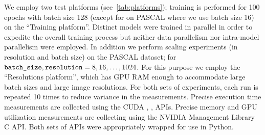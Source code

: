 

We employ two test platforms (see~\cref{tab:platforms});
training is performed for 100 epochs with batch size 128 (except for on PASCAL where we use batch size 16) on the ``Training platform''.
Distinct models were trained in parallel in order to expedite the overall training process but neither data parallelism nor intra-model parallelism were employed.
In addition we perform scaling experiments (in resolution and batch size) on the PASCAL dataset;
for $\texttt{batch\_size}, \texttt{resolution} = 8, 16, \dots, 1024$.
For this purpose we employ the ``Resolutions platform'', which has GPU RAM enough to accommodate large batch sizes and large image resolutions.
For both sets of experiments, each run is repeated 10 times to reduce variance in the measurements.
Precise execution time measurements are collected using the CUDA , ,  APIs.
Precise memory and GPU utilization measurements are collecting using the NVIDIA Management Library C API\@.
Both sets of APIs were appropriately wrapped for use in Python.




